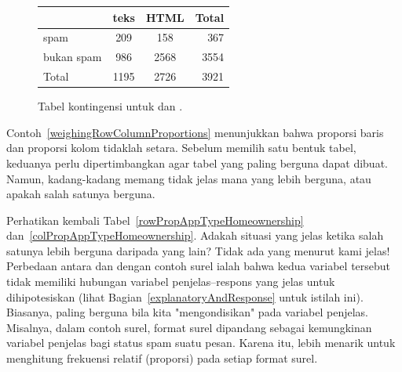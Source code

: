 \begin{figure}[ht]
\centering
\begin{tabular}{l cc r}
  \hline
  & teks & HTML & Total \\ 
  \hline
  spam & 209 & 158 & 367 \\ 
  bukan spam & 986 & 2568 & 3554 \\ 
  \hline
  Total & 1195 & 2726 & 3921 \\
  \hline
\end{tabular}
\caption{Tabel kontingensi untuk  dan .}
\label{emailSpamHTMLTableTotals}
\end{figure}

Contoh~\ref{weighingRowColumnProportions} menunjukkan
bahwa proporsi baris dan proporsi kolom tidaklah setara.
Sebelum memilih satu bentuk tabel,
keduanya perlu dipertimbangkan agar tabel yang paling berguna
dapat dibuat.
Namun, kadang-kadang memang tidak jelas mana yang lebih berguna,
atau apakah salah satunya berguna.

\begin{examplewrap}
\begin{nexample}{Perhatikan kembali
    Tabel~\ref{rowPropAppTypeHomeownership}
    dan~\ref{colPropAppTypeHomeownership}.
    Adakah situasi yang jelas ketika salah satunya lebih berguna
    daripada yang lain?}
  Tidak ada yang menurut kami jelas!
  Perbedaan antara 
  dan  dengan contoh surel ialah bahwa
  kedua variabel tersebut tidak memiliki hubungan variabel
  penjelas--respons yang jelas untuk dihipotesiskan
  (lihat Bagian~\ref{explanatoryAndResponse} untuk istilah ini).
  Biasanya, paling berguna bila kita "mengondisikan" pada
  variabel penjelas.
  Misalnya, dalam contoh surel, format surel dipandang sebagai
  kemungkinan variabel penjelas bagi status spam suatu pesan.
  Karena itu, lebih menarik untuk menghitung frekuensi relatif
  (proporsi) pada setiap format surel.
\end{nexample}
\end{examplewrap}



